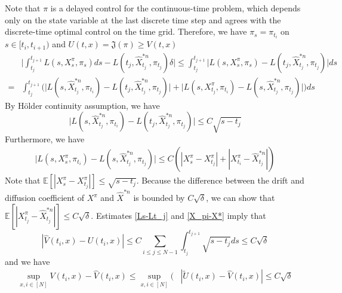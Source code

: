 \documentclass{article}
\numberwithin{equation}{section}
\begin{document}
Note that ${\pi}$ is a delayed control for the continuous-time problem, which depends only on the state variable at  the last discrete time step and agrees with the discrete-time optimal control on the time grid. 
Therefore, we have  ${\pi}_s={\pi}_{t_i}$ on $s\in[t_i,t_{i+1})$ and ${U}(t,x) = \mathfrak{J}({\pi})\ge V(t,x)$
\begin{equation}
\begin{split}
    &\bigg|\int_{t_{j}}^{t_{j+1}} \!\!\!\!\!\!\! L(s,{X}^{\pi}_{s},{\pi}_{s})ds-L(t_{j},\hat{X}^{*n}_{t_{j}},{\pi}_{t_j})\delta\bigg|\le \int_{t_{j}}^{t_{j+1}} \!\!\!\!\!\!\!\big|L(s,{X}^\pi_{s},{\pi}_{s})-L(t_{j},\hat{X}^{*n}_{t_{j}},{\pi}_{t_j})\big|ds\\
    = &\int_{t_{j}}^{t_{j+1}} \!\!\!\!\Big(\big|L(s,\hat{X}^{*n}_{t_{j}},{\pi}_{t_i})-L(t_{j},\hat{X}^{*n}_{t_{j}},{\pi}_{t_j})\big|+\big|L(s,{X}^\pi_{t_{j}},{\pi}_{t_i})-L(s,\hat{X}^{*n}_{t_{j}},{\pi}_{t_j})\big|\Big)ds
\end{split}
\end{equation}
By Hölder continuity assumption, we have
\begin{equation}\label{Ls-Lt_j}
    |L(s,\hat{X}^{*n}_{t_{j}},{\pi}_{t_i})-L(t_{j},\hat{X}^{*n}_{t_{j}},{\pi}_{t_j})\big|\le C \sqrt{s-t_j}
\end{equation}
Furthermore, we have 
\begin{equation}\label{X_pi-X*}
\begin{split}
     \big|L(s,{X}^\pi_{s},{\pi}_{t_i})-L(s,\hat{X}^{*n}_{t_{j}},{\pi}_{t_j})\big|\le C (|{X}^\pi_{s}-{X}^{\pi}_{t_{j}}|+ |{X}^\pi_{t_i}-\hat{X}^{*n}_{t_{j}}|)
\end{split}
\end{equation}
Note that $\mathbb{E}[|{X}^\pi_{s}-{X}^{\pi}_{t_{j}}|]\le \sqrt{s-t_j}$. 
Because the difference between the drift and diffusion coefficient of ${X}^\pi$ and $\hat{X}^{*n}$ is bounded by $C\sqrt{\delta}$, we can show that $\mathbb{E}[|{X}^\pi_{t_j}-\hat{X}^{*n}_{t_{j}}|]\le C\sqrt{\delta}$.
Estimates \eqref{Ls-Lt_j} and \eqref{X_pi-X*} imply that
\begin{equation}\label{eqn:tildeU-U-int}
    |\hat{V}(t_{i},x)-{U}(t_{i},x)|\le C\sum_{i\le j\le N-1} \int_{t_{j}}^{t_{j+1}}\!\!\!\!\!\!\! \sqrt{s-t_j}ds\le C\sqrt{\delta}
\end{equation}
and we have 
\begin{equation}
    \begin{split}
        \sup_{x, i\in[N]}{V}(t_{i},x)-\hat{V}(t_{i},x)\le  \sup_{x, i\in[N]} \big(&|\tilde U(t_{i},x)-\hat{V}(t_{i},x)|\le C\sqrt{\delta}
    \end{split}
\end{equation}
\end{document}
